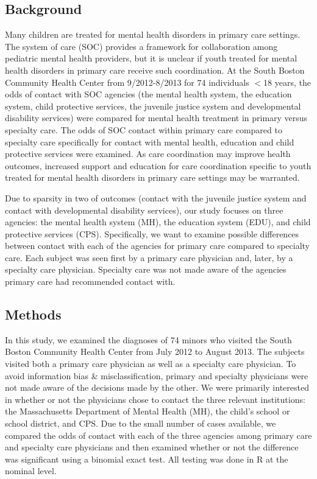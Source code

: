 \documentclass{article}
\begin{document}
	\subsection*{Background}
	Many children are treated for mental health disorders in primary care settings.  The system of care (SOC) provides a framework for collaboration among pediatric mental health providers, but it is unclear if youth treated for mental health disorders in primary care receive such coordination.  At the South Boston Community Health Center from 9/2012-8/2013 for 74 individuals $<$18 years, the odds of contact with SOC agencies (the mental health system, the education system, child protective services, the juvenile justice system and developmental disability services) were compared for mental health treatment in primary versus specialty care.  The odds of SOC contact within primary care compared to specialty care specifically for contact with mental health, education and child protective services were examined.  As care coordination may improve health outcomes, increased support and education for care coordination specific to youth treated for mental health disorders in primary care settings may be warranted.
	
	Due to sparsity in two of outcomes (contact with the juvenile justice system and contact with developmental disability services), our study focuses on three agencies: the mental health system (MH), the education system (EDU), and child protective services (CPS). Specifically, we want to examine possible differences between contact with each of the agencies for primary care compared to specialty care. Each subject was seen first by a primary care physician and, later, by a specialty care physician. Specialty care was not made aware of the agencies primary care had recommended contact with. 

	\subsection*{Methods}
	In this study, we examined the diagnoses of 74 minors who visited the South Boston Community Health Center from July 2012 to August 2013. The subjects visited both a primary care physician as well as a specialty care physician. To avoid information bias \& misclassification, primary and specialty physicians were not made aware of the decisions made by the other. We were primarily interested in whether or not the physicians chose to contact the three relevant institutions: the Massachusetts Department of Mental Health (MH), the child’s school or school district, and CPS. Due to the small number of cases available, we compared the odds of contact with each of the three agencies among primary care and specialty care physicians and then examined whether or not the difference was significant using a binomial exact test. All testing was done in R at the nominal level.
\end{document}

